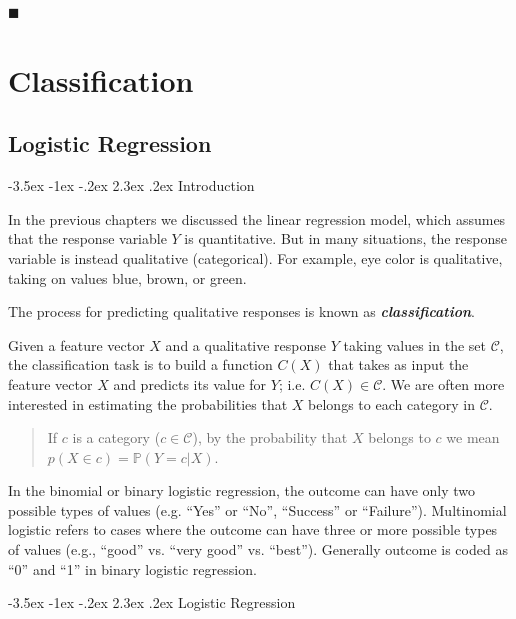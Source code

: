 \documentclass[]{book}
\makeatletter
\renewcommand\section{\@startsection {section}{1}{\z@}%
                                   {-3.5ex \@plus -1ex \@minus -.2ex}%
                                   {2.3ex \@plus.2ex}%
                                   {\normalfont\Large\bfseries\color{ForestGreen}}}
\theoremstyle{definition}
\theoremstyle{definition}
\theoremstyle{definition}
\theoremstyle{remark}
\makeatother
\begin{document}
◼

\part*{Classification}\label{part-classification}

\chapter{Logistic Regression}\label{logistic-regression}

\section{Introduction}\label{introduction-1}

In the previous chapters we discussed the linear regression model, which
assumes that the response variable \(Y\) is quantitative. But in many
situations, the response variable is instead qualitative (categorical).
For example, eye color is qualitative, taking on values blue, brown, or
green.

The process for predicting qualitative responses is known as
\textbf{\emph{classification}}.

Given a feature vector \(X\) and a qualitative response \(Y\) taking
values in the set \(\mathcal{C}\), the classification task is to build a
function \(C(X)\) that takes as input the feature vector \(X\) and
predicts its value for \(Y\); i.e. \(C(X) \in \mathcal{C}\). We are
often more interested in estimating the probabilities that \(X\) belongs
to each category in \(\mathcal{C}\).

\begin{quote}
If \(c\) is a category (\(c \in \mathcal{C}\)), by the probability that
\(X\) belongs to \(c\) we mean \(p(X \in c) = \mathbb{P}(Y=c|X)\).
\end{quote}

In the binomial or binary logistic regression, the outcome can have only
two possible types of values (e.g. ``Yes'' or ``No'', ``Success'' or
``Failure''). Multinomial logistic refers to cases where the outcome can
have three or more possible types of values (e.g., ``good'' vs. ``very
good'' vs. ``best''). Generally outcome is coded as ``0'' and ``1'' in
binary logistic regression.

\section{Logistic Regression}\label{logistic-regression-1}
\end{document}
